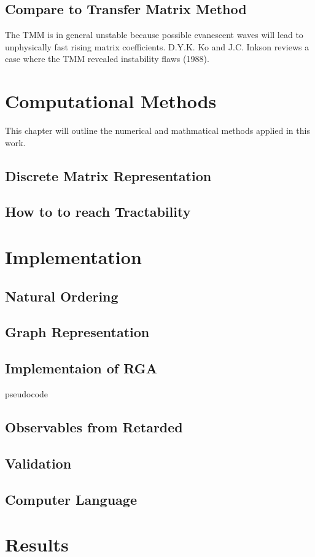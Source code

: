   \subsection{Compare to Transfer Matrix Method}
  The TMM is in general unstable because possible evanescent waves will lead to unphysically fast rising matrix coefficients.
  D.Y.K. Ko and J.C. Inkson reviews a case where the TMM revealed instability flaws (1988).
\clearpage
\section{Computational Methods}
This chapter will outline the numerical and mathmatical methods applied in this work.
  \subsection{Discrete Matrix Representation}
  
  \subsection{How to to reach Tractability}
  
\section{Implementation}
\subsection{Natural Ordering}
\subsection{Graph Representation}
\subsection{Implementaion of RGA}
pseudocode
\subsection{Observables from Retarded \gfnc}
\subsection{Validation}
\subsection{Computer Language}
\section{Results}

